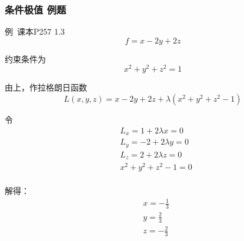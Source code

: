 \begin{frame}
    \frametitle{条件极值 例题}
    例\ 课本P257 1.3
    \begin{displaymath}
        f = x - 2y + 2z
    \end{displaymath}
    
    约束条件为
    \begin{displaymath}
        x^2 + y^2 + z^2 = 1
    \end{displaymath}

    由上，作拉格朗日函数
    \begin{displaymath}
        L(x, y, z) = x - 2y + 2z + \lambda (x^2 + y^2 + z^2 - 1)
    \end{displaymath}

\end{frame}
\begin{frame}
    令
    \begin{displaymath}
        \begin{split}
            &L_x = 1 + 2\lambda x = 0\\
            &L_y = -2 + 2\lambda y = 0\\
            &L_z = 2 + 2\lambda z = 0\\
            &x^2 + y^2 + z^2 - 1 = 0\\
        \end{split}
    \end{displaymath}

    解得：
    \begin{displaymath}
        \begin{split}
            &x = -\frac{1}{3} \\
            &y = \frac{2}{3} \\
            &z = -\frac{2}{3}
        \end{split}
    \end{displaymath}
\end{frame}
